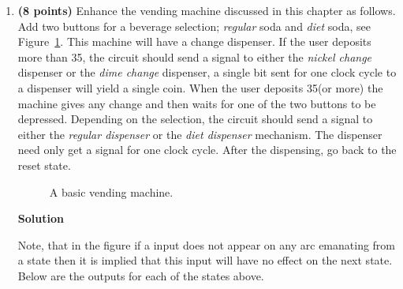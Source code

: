 \begin{enumerate}
\begin{onlysolution}
{The cost of this solution is 6*8 + 6 + 2 + 9 + 6 + 6 + 9 + 6 + 2 + 5 = 48 + 51 = 99
}\end{onlysolution} 

\item \textbf{ (8 points)}
Enhance the vending machine discussed in this chapter as follows.
Add two buttons for a beverage selection; \textit{ regular} soda and \textit{ diet}
soda, see Figure~\ref{fig:Vend}.  This machine will have a change dispenser.  
If the user deposits more than 35\textcent, the circuit should send a signal to
either the \textit{ nickel change} dispenser or the \textit{ dime change} dispenser, 
a single bit sent for one clock cycle to a dispenser will yield a single coin.
When the user deposits 35\textcent (or more) the machine gives any change and 
then waits for one of the two buttons to be depressed.  Depending on the 
selection, the circuit should send a signal to either the 
\textit{ regular dispenser} or
the \textit{ diet dispenser} mechanism.  The dispenser need only get a signal for
one clock cycle.  After the dispensing, go back to the reset state.
\begin{figure}[ht]
\caption{A basic vending machine.}
\label{fig:Vend}
\end{figure}

\begin{onlysolution}  \textbf{Solution} \itshape{

\begin{figure}[ht]
\end{figure}

Note, that in the figure if a input does not appear on
any arc emanating from a state then it is implied that
this input will have no effect on the next state.  Below
are the outputs for each of the states above.

}
\end{onlysolution}
\end{enumerate}
